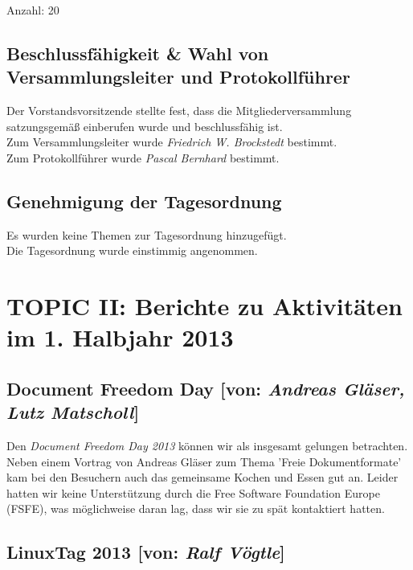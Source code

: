 \documentclass[11pt,a4paper,ngerman]{article}
\begin{document}
    Anzahl: 20

  \subsection{Beschlussfähigkeit \& Wahl von Versammlungsleiter und 
	      Protokollführer}

	      Der Vorstandsvorsitzende stellte fest, dass die 
	      Mitgliederversammlung satzungsgemäß einberufen wurde und 
	      beschlussfähig ist. \\
	      Zum Versammlungsleiter wurde \emph{Friedrich W. Brockstedt} 
	      bestimmt. \\
	      Zum Protokollführer wurde \emph{Pascal Bernhard} bestimmt.



  \subsection{Genehmigung der Tagesordnung}

	      Es wurden keine Themen zur Tagesordnung hinzugefügt. \\
	      Die Tagesordnung wurde einstimmig angenommen.

\newpage{}	  
	
	
\section{TOPIC II: Berichte zu Aktivitäten im 1. Halbjahr 2013}

  
  \subsection{Document Freedom Day [von: 
              \textcolor{hellgrau.60}{\textsl{Andreas Gläser, Lutz Matscholl}}]}

              
Den \textsl{Document Freedom Day 2013} können wir als insgesamt 
gelungen betrachten. Neben einem Vortrag von Andreas Gläser zum Thema 'Freie 
Dokumentformate' kam bei den Besuchern auch das gemeinsame Kochen und Essen gut 
an. Leider hatten wir keine Unterstützung durch die Free Software Foundation 
Europe (FSFE), was möglichweise daran lag, dass wir sie zu spät kontaktiert 
hatten.



  \subsection{LinuxTag 2013 [von:          
	      \textcolor{hellgrau.60}{\textsl{Ralf Vögtle}}]}
	    
\end{document}
